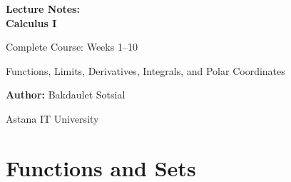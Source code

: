 \documentclass[11pt,a4paper]{article}
\begin{document}
\begin{titlepage}
\centering
\vspace*{3cm}
{\Huge\bfseries Lecture Notes:\\ Calculus I\par}
\vspace{1cm}
{\Large Complete Course: Weeks 1--10\par}
\vspace{0.5cm}
{\large Functions, Limits, Derivatives, Integrals, and Polar Coordinates\par}
\vspace{2cm}
{\large \textbf{Author:} Bakdaulet Sotsial\par}
\vspace{1cm}
\vfill
{\small Astana IT University \par}
\vspace*{2cm}
\end{titlepage}
\tableofcontents
\newpage
\section{Functions and Sets}
\end{document}
